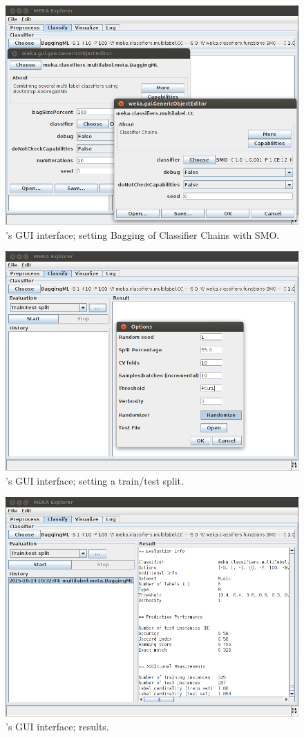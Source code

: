 \documentclass[11pt]{article}
\begin{document}

\begin{figure}
	\centering
	\includegraphics[height=0.60\textwidth]{GUI02.png}
	\caption{\label{screen:eval} 's GUI interface; setting Bagging of Classifier Chains with SMO.}
\end{figure}

\begin{figure}
	\centering
	\includegraphics[height=0.60\textwidth]{GUI03.png}
	\caption{\label{screen:split} 's GUI interface; setting a train/test split.}
\end{figure}

\begin{figure}
	\centering
	\includegraphics[height=0.60\textwidth]{GUI04.png}
	\caption{\label{screen:result} 's GUI interface; results.}
\end{figure}
\end{document}
